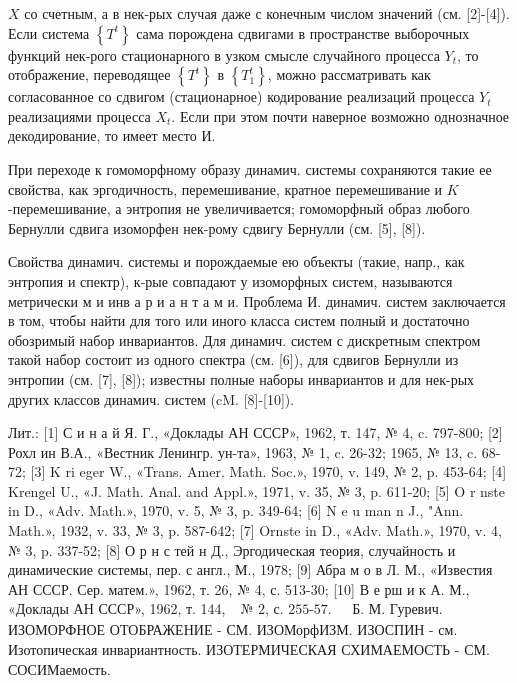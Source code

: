 \documentclass[10pt]{article}
\begin{document}
$X$ со счетным, а в нек-рых случая даже с конечным числом значений (см. [2]-[4]). Если система $\left\{T^{t}\right\}$ сама порождена сдвигами в пространстве выборочных функций нек-рого стационарного в узком смысле случайного процесса $Y_{t}$, то отображение, переводящее $\left\{T^{t}\right\}$ в $\left\{T_{1}^{t}\right\}$, можно рассматривать как согласованное со сдвигом (стационарное) кодирование реализаций процесса $Y_{t}$ реализациями процесса $X_{t}$. Если при этом почти наверное возможно однозначное декодирование, то имеет место И.



При переходе к гомоморфному образу динамич. системы сохраняются такие ее свойства, как эргодичность, перемешивание, кратное перемешивание и $K$-перемешивание, а энтропия не увеличивается; гомоморфный образ любого Бернулли сдвига изоморфен нек-рому сдвигу Бернулли (см. [5], [8]).



Свойства динамич. системы и порождаемые ею объекты (такие, напр., как энтропия и спектр), к-рые совпадают у изоморфных систем, называются метрически м и инв а р и а н т а м и. Проблема И. динамич. систем заключается в том, чтобы найти для того или иного класса систем полный и достаточно обозримый набор инвариантов. Для динамич. систем с дискретным спектром такой набор состоит из одного спектра (см. [6]), для сдвигов Бернулли из энтропии (см. [7], [8]); известны полные наборы инвариантов и для нек-рых других классов динамич. систем (cM. [8]-[10]).



Лит.: [1] С и н а й Я. Г., «Доклады АН СССР», 1962, т. 147, № 4, c. 797-800; [2] Рохл ин В.А., «Вестник Ленингр. ун-та», 1963, № 1, c. 26-32; 1965, № 13, c. 68-72; [3] K ri eger W., «Trans. Amer. Math. Soc.», 1970, v. 149, № 2, p. 453-64; [4] Krengel U., «J. Math. Anal. and Appl.», 1971, v. 35, № 3, p. 611-20; [5] O r nste in D., «Adv. Math.», 1970, v. 5, № 3, p. 349-64; [6] N e u man n J., "Ann. Math.», 1932, v. 33, № 3, p. 587-642; [7] Ornste in D., «Adv. Math.», 1970, v. 4, № 3, p. 337-52; [8] О р н с тей н Д., Эргодическая теория, случайность и динамические системы, пер. с англ., М., 1978; [9] Абра м о в Л. М., «Известия АН СССР. Сер. матем.», 1962, т. 26, № 4, с. 513-30; [10] В е рш и к А. М., «Доклады АН СССР», 1962, т. 144, $\begin{array}{ll}\text { № 2, с. 255-57. } & \text { Б. М. Гуревич. }\end{array}$ ИЗОМОРФНОЕ ОТОБРАЖЕНИЕ - СМ. ИЗОМорфИЗМ. ИЗОСПИН - см. Изотопическая инвариантность. ИЗОТЕРМИЧЕСКАЯ СХИМАЕМОСТЬ - СМ. СОСИМаемость.
\end{document}
